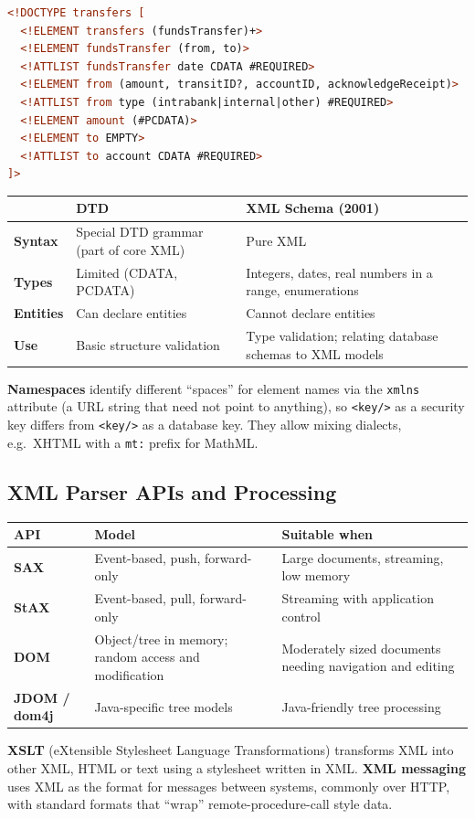 \documentclass[11pt,a4paper,openany]{report}
\begin{document}
\begin{lstlisting}[language=XML]
<!DOCTYPE transfers [
  <!ELEMENT transfers (fundsTransfer)+>
  <!ELEMENT fundsTransfer (from, to)>
  <!ATTLIST fundsTransfer date CDATA #REQUIRED>
  <!ELEMENT from (amount, transitID?, accountID, acknowledgeReceipt)>
  <!ATTLIST from type (intrabank|internal|other) #REQUIRED>
  <!ELEMENT amount (#PCDATA)>
  <!ELEMENT to EMPTY>
  <!ATTLIST to account CDATA #REQUIRED>
]>
\end{lstlisting}

\begin{center}
\begin{tabularx}{\textwidth}{>{\bfseries}lXX}
\toprule
 & DTD & XML Schema (2001)\\
\midrule
Syntax & Special DTD grammar (part of core XML) & Pure XML\\
Types & Limited (CDATA, PCDATA) & Integers, dates, real numbers in a range, enumerations\\
Entities & Can declare entities & Cannot declare entities\\
Use & Basic structure validation & Type validation; relating database schemas to XML models\\
\bottomrule
\end{tabularx}
\end{center}

\textbf{Namespaces} identify different ``spaces'' for element names via the \texttt{xmlns} attribute (a URL string that
need not point to anything), so \verb|<key/>| as a security key differs from \verb|<key/>| as a database key. They
allow mixing dialects, e.g.\ XHTML with a \texttt{mt:} prefix for MathML.

\subsection{XML Parser APIs and Processing}
\begin{center}
\begin{tabularx}{\textwidth}{>{\bfseries}lXX}
\toprule
API & Model & Suitable when\\
\midrule
SAX & Event-based, push, forward-only & Large documents, streaming, low memory\\
StAX & Event-based, pull, forward-only & Streaming with application control\\
DOM & Object/tree in memory; random access and modification & Moderately sized documents needing navigation and
editing\\
JDOM / dom4j & Java-specific tree models & Java-friendly tree processing\\
\bottomrule
\end{tabularx}
\end{center}
\textbf{XSLT} (eXtensible Stylesheet Language Transformations) transforms XML into other XML, HTML or text using a
stylesheet written in XML. \textbf{XML messaging} uses XML as the format for messages between systems, commonly over
HTTP, with standard formats that ``wrap'' remote-procedure-call style data.
\end{document}
